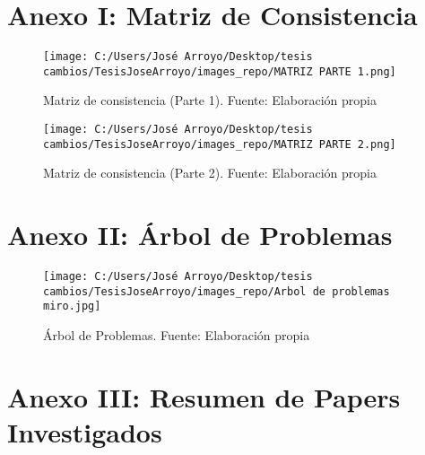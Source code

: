 \chapter{Anexo I: Matriz de Consistencia}

\begin{figure}[h!]
	\centering
	\texttt{[image: C:/Users/José Arroyo/Desktop/tesis cambios/TesisJoseArroyo/images\_repo/MATRIZ PARTE 1.png]}
	\caption{Matriz de consistencia (Parte 1). Fuente: Elaboración propia}
	\label{fig:matriz_parte1}
\end{figure}

\begin{figure}[h!]
	\centering
	\texttt{[image: C:/Users/José Arroyo/Desktop/tesis cambios/TesisJoseArroyo/images\_repo/MATRIZ PARTE 2.png]}
	\caption{Matriz de consistencia (Parte 2). Fuente: Elaboración propia}
	\label{fig:matriz_parte2}
\end{figure}

\chapter{Anexo II: Árbol de Problemas}

\begin{figure}[h!]
	\centering
	\texttt{[image: C:/Users/José Arroyo/Desktop/tesis cambios/TesisJoseArroyo/images\_repo/Arbol de problemas miro.jpg]}
	\caption{Árbol de Problemas. Fuente: Elaboración propia}
	\label{fig:arbol_problemas}
\end{figure}

\chapter{Anexo III: Resumen de Papers Investigados}

